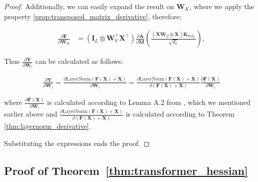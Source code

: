 \documentclass{article}
\begin{document}
\begin{proof}
Additionally, we can easily expand the result on $\mathbf{W}_K$, where we apply the property \ref{prop:transposed_matrix_derivative}, therefore:  

\begin{align*}
\frac{\partial \mathbf{F}}{\partial \mathbf{W}_K} &= \left(\mathbf{I}_L \otimes \mathbf{W}_{V}^{\top}\mathbf{X}^\top\right) \frac{\partial \mathbf{A}}{\partial \mathbf{M}} \left(\frac{(\mathbf{X} \mathbf{W}_Q \otimes \mathbf{X})\mathbf{K}_{d_V d_K}}{\sqrt{d_k}}\right),
\end{align*}

Thus $\frac{\partial \mathbf{Y}}{\partial\mathbf{W}_i}$ can be calculated as follows:

\begin{align*}
    \frac{\partial \mathbf{Y}}{\partial\mathbf{W}_i} = \frac{\partial \text{LayerNorm}(\mathbf{F} (\mathbf{X}) + \mathbf{X})}{\partial \mathbf{W}_i} = \frac{\partial \text{LayerNorm}(\mathbf{F} (\mathbf{X}) + \mathbf{X})}{\partial (\mathbf{F} (\mathbf{X}) + \mathbf{X})} \frac{\partial \mathbf{F}(\mathbf{X})}{\partial \mathbf{W}_i}
\end{align*}

where $\frac{\partial \mathbf{F}(\mathbf{X})}{\partial \mathbf{W}_i}$ is calculated according to Lemma A.2 from \cite{noci2022signalpropagationtransformerstheoretical}, which we mentioned earlier above and $\frac{\partial \text{LayerNorm}(\mathbf{F} (\mathbf{X}) + \mathbf{X})}{\partial (\mathbf{F} (\mathbf{X}) + \mathbf{X})}$ is calculated according to Theorem \ref{thm:layernorm_derivative}.

Substituting the expressions ends the proof.
\end{proof}

\subsection{Proof of Theorem~\ref{thm:transformer_hessian}}\label{app:proof_transformer_hessian}
\end{document}
